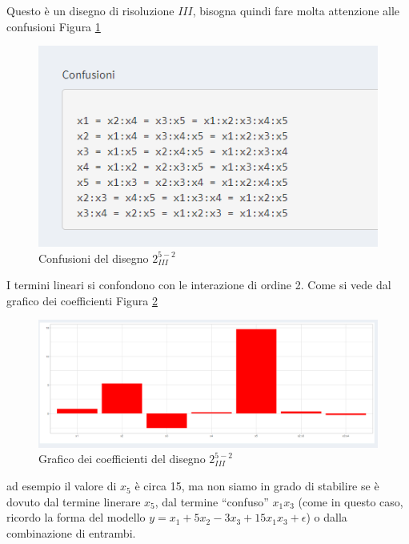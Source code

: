 \documentclass[
  11pt,
]{book}
\begin{document}
Questo è un disegno di risoluzione \(III\), bisogna quindi fare molta attenzione alle confusioni Figura \ref{fig:fz13}

\begin{figure}[ht]

{\centering \includegraphics[width=1\linewidth]{Immagini/Fraz/13_Conf_ris3} 

}

\caption{Confusioni del disegno $2^{5-2}_{III}$}\label{fig:fz13}
\end{figure}

I termini lineari si confondono con le interazione di ordine 2. Come si vede dal grafico dei coefficienti Figura \ref{fig:fz14}

\begin{figure}[ht]

{\centering \includegraphics[width=1\linewidth]{Immagini/Fraz/14_Conf_ris3} 

}

\caption{Grafico dei coefficienti del disegno $2^{5-2}_{III}$}\label{fig:fz14}
\end{figure}

ad esempio il valore di \(x_5\) è circa 15, ma non siamo in grado di stabilire se è dovuto dal termine linerare \(x_5\), dal termine ``confuso'' \(x_1x_3\) (come in questo caso, ricordo la forma del modello \(y=x_1+5x_2-3x_3+15x_1x_3+\epsilon\)) o dalla combinazione di entrambi.
\end{document}
